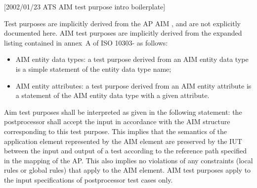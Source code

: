 [2002/01/23 ATS AIM test purpose intro boilerplate]

    Test purposes are implicitly derived from the AP AIM \Express,
and are not explicitly documented here. AIM test purposes are implicitly
derived from the expanded \Express{} listing contained in
annex~A of ISO 10303-\theAPpartno{} as follows:
\begin{itemize}
\item AIM entity data types: a test purpose derived from an AIM
      entity data type is a simple statement of the entity data type name;

\item AIM entity attributes: a test purpose derived from an AIM
      entity attribute is a statement of the AIM entity data type with
      a given attribute.
\end{itemize}

    Aim test purposes shall be interpreted as given in the
following statement:
the postprocessor shall accept the input in accordance with the
AIM \Express{} structure corresponding to this test purpose.
This implies that the semantics of the application element
represented by the AIM element are preserved by the IUT between
the input and output of a test according to the reference path
specified in the mapping
\maptableorspec{}
of the AP. This also implies
no violations of any constraints (local rules or global
rules) that apply to the AIM element. AIM test purposes apply
to the input specifications of postprocessor test cases only.
\par

\endinput
